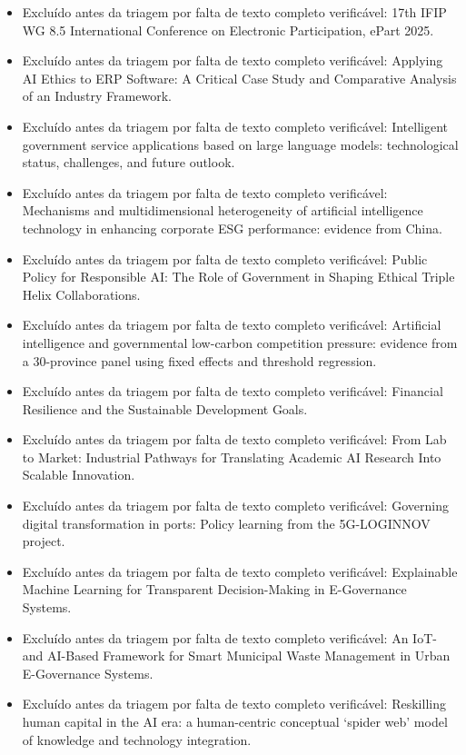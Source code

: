 \documentclass[12pt,a4paper]{article}
\begin{document}
\begin{itemize}
\item Excluído antes da triagem por falta de texto completo verificável: 17th IFIP WG 8.5 International Conference on Electronic Participation, ePart 2025.
\item Excluído antes da triagem por falta de texto completo verificável: Applying AI Ethics to ERP Software: A Critical Case Study and Comparative Analysis of an Industry Framework.
\item Excluído antes da triagem por falta de texto completo verificável: Intelligent government service applications based on large language models: technological status, challenges, and future outlook.
\item Excluído antes da triagem por falta de texto completo verificável: Mechanisms and multidimensional heterogeneity of artificial intelligence technology in enhancing corporate ESG performance: evidence from China.
\item Excluído antes da triagem por falta de texto completo verificável: Public Policy for Responsible AI: The Role of Government in Shaping Ethical Triple Helix Collaborations.
\item Excluído antes da triagem por falta de texto completo verificável: Artificial intelligence and governmental low-carbon competition pressure: evidence from a 30-province panel using fixed effects and threshold regression.
\item Excluído antes da triagem por falta de texto completo verificável: Financial Resilience and the Sustainable Development Goals.
\item Excluído antes da triagem por falta de texto completo verificável: From Lab to Market: Industrial Pathways for Translating Academic AI Research Into Scalable Innovation.
\item Excluído antes da triagem por falta de texto completo verificável: Governing digital transformation in ports: Policy learning from the 5G-LOGINNOV project.
\item Excluído antes da triagem por falta de texto completo verificável: Explainable Machine Learning for Transparent Decision-Making in E-Governance Systems.
\item Excluído antes da triagem por falta de texto completo verificável: An IoT- and AI-Based Framework for Smart Municipal Waste Management in Urban E-Governance Systems.
\item Excluído antes da triagem por falta de texto completo verificável: Reskilling human capital in the AI era: a human-centric conceptual ‘spider web’ model of knowledge and technology integration.

\end{itemize}
\end{document}

